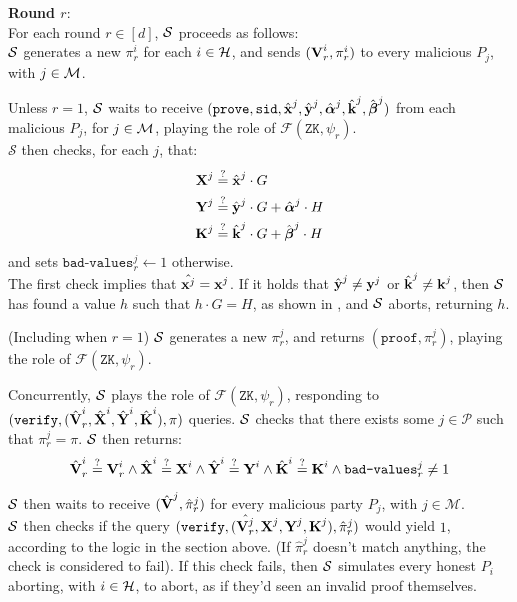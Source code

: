 \textbf{Round $r$}:\\
For each round $r \in [d]$, $\mathcal{S}$ proceeds as follows:\\
$\mathcal{S}$ generates a new $\pi^i_r$ for each $i \in \mathcal{H}$, and sends
$(\textbf{V}^i_r, \pi^i_r)$ to every malicious $P_j$, with $j \in \mathcal{M}$.

Unless $r = 1$, $\mathcal{S}$ waits to receive 
$(\texttt{prove}, \texttt{sid}, \hat{\textbf{x}}^j, \hat{\textbf{y}}^j, \hat{\boldsymbol{\alpha}}^j, \hat{\textbf{k}}^j, \hat{\boldsymbol{\beta}}^j)$
from each malicious $P_j$, for $j \in \mathcal{M}$, playing the role of $\mathcal{F}(\texttt{ZK}, \psi_r)$.\\
$\mathcal{S}$ then checks, for each $j$, that:
$$
\begin{aligned}
\textbf{X}^j &\stackrel{?}{=} \hat{\textbf{x}}^j \cdot G\\
\textbf{Y}^j &\stackrel{?}{=} \hat{\textbf{y}}^j \cdot G + \hat{\boldsymbol{\alpha}}^j \cdot H\\
\textbf{K}^j &\stackrel{?}{=} \hat{\textbf{k}}^j \cdot G + \hat{\boldsymbol{\beta}}^j \cdot H
\end{aligned}
$$
and sets $\texttt{bad-values}^j_r \gets 1$ otherwise.\\
The first check implies that $\hat{\textbf{x}^j} = \textbf{x}^j$. If it holds that
$\hat{\textbf{y}}^j \neq \textbf{y}^j$ or $\hat{\textbf{k}}^j \neq \textbf{k}^j$, then $\mathcal{S}$ has
found a value $h$ such that $h \cdot G = H$, as shown in ,
and $\mathcal{S}$ aborts, returning $h$.

(Including when $r = 1$) $\mathcal{S}$ generates a new $\pi^j_r$, and returns $(\texttt{proof}, \pi^j_r)$,
playing the role of $\mathcal{F}(\texttt{ZK}, \psi_r)$.

Concurrently, $\mathcal{S}$ plays the role of $\mathcal{F}(\texttt{ZK}, \psi_r)$,
responding to $(\texttt{verify}, (\hat{\textbf{V}}^i_r, \hat{\textbf{X}}^i, \hat{\textbf{Y}}^i, \hat{\textbf{K}}^i), \pi)$
queries. $\mathcal{S}$ checks that there exists some $j \in \mathcal{P}$ such that
$\pi^j_r = \pi$. $\mathcal{S}$ then returns:
$$
\hat{\textbf{V}}^i_r \stackrel{?}{=} \textbf{V}^i_r \land
\hat{\textbf{X}}^i \stackrel{?}{=} \textbf{X}^i \land
\hat{\textbf{Y}}^i \stackrel{?}{=} \textbf{Y}^i \land
\hat{\textbf{K}}^i \stackrel{?}{=} \textbf{K}^i \land
\texttt{bad-values}^j_r \neq 1
$$

$\mathcal{S}$ then waits to receive $(\hat{\textbf{V}}^j, \hat{\pi}^j_r)$ for
every malicious party $P_j$, with ${j \in \mathcal{M}}$.\\
$\mathcal{S}$ then checks if the query $(\texttt{verify}, (\hat{\textbf{V}^j_r}, \textbf{X}^j, \textbf{Y}^j, \textbf{K}^j), \hat{\pi}^j_r)$
would yield $1$, according to the logic in the section above.
(If $\hat{\pi}^j_r$ doesn't match anything, the check is considered to fail).
If this check fails, then $\mathcal{S}$ simulates every honest $P_i$ aborting, with $i \in \mathcal{H}$,
to abort, as if they'd seen an invalid proof themselves.

